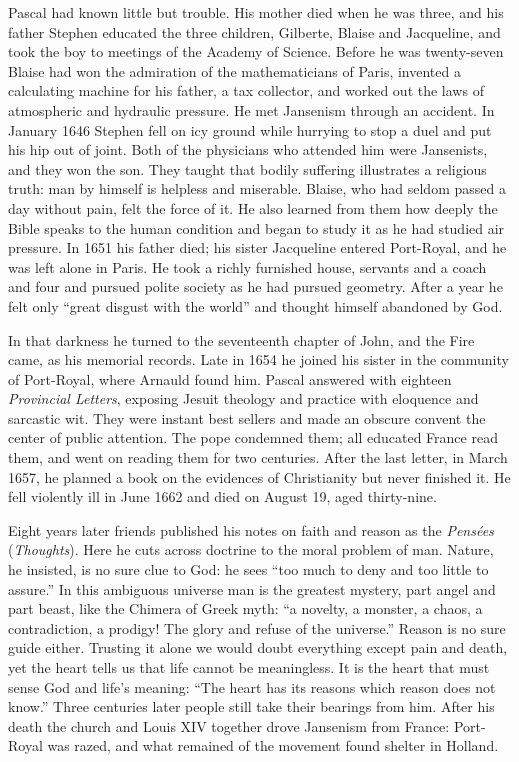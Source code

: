 Pascal had known little but trouble. His mother died when he was three, and his father Stephen
educated the three children, Gilberte, Blaise and Jacqueline, and took the boy to meetings of the
Academy of Science. Before he was twenty-seven Blaise had won the admiration of the mathematicians of
Paris, invented a calculating machine for his father, a tax collector, and worked out the laws of atmospheric and hydraulic pressure. He met Jansenism through an accident. In January
1646 Stephen fell on icy ground while hurrying to stop a duel and put his hip out of joint. Both of the physicians who attended him were Jansenists, and they won the son. They taught that bodily suffering
illustrates a religious truth: man by himself is helpless and miserable. Blaise, who had seldom
passed a day without pain, felt the force of it. He also learned from them how deeply the Bible
speaks to the human condition and began to study it as he had studied air pressure. In 1651 his
father died; his sister Jacqueline entered Port-Royal, and he was left alone in Paris. He took a
richly furnished house, servants and a coach and four and pursued polite society as he had pursued
geometry. After a year he felt only ``great disgust with the world'' and thought himself abandoned by
God.

In that darkness he turned to the seventeenth chapter of John, and the Fire came, as his memorial
records. Late in 1654 he joined his sister in the community of Port-Royal, where Arnauld found him.
Pascal answered with eighteen \emph{Provincial Letters}, exposing Jesuit theology and practice with
eloquence and sarcastic wit. They were instant best sellers and made an obscure convent the center of
public attention. The pope condemned them; all educated France read them, and went on reading them
for two centuries. After the last letter, in March 1657, he planned a book on the evidences of
Christianity but never finished it. He fell violently ill in June 1662 and died on August 19, aged
thirty-nine.

Eight years later friends published his notes on faith and reason as the \emph{Pens\'ees}
(\emph{Thoughts}). Here he cuts across doctrine to the moral problem of man. Nature, he insisted, is
no sure clue to God: he sees ``too much to deny and too little to assure.'' In this ambiguous
universe man is the greatest mystery, part angel and part beast, like the Chimera of Greek myth: ``a
novelty, a monster, a chaos, a contradiction, a prodigy! The glory and refuse of the universe.''
Reason is no sure guide either. Trusting it alone we would doubt everything except pain and death,
yet the heart tells us that life cannot be meaningless. It is the heart that must sense God and life's meaning: ``The heart has its reasons which reason does not know.'' Three centuries later people
still take their bearings from him. After his death the church and Louis XIV together drove Jansenism
from France: Port-Royal was razed, and what remained of the movement found shelter in Holland.

